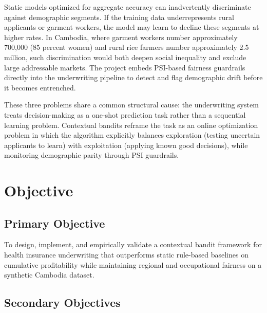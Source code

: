 Static models optimized for aggregate accuracy can inadvertently discriminate against demographic segments. If the training data underrepresents rural applicants or garment workers, the model may learn to decline these segments at higher rates. In Cambodia, where garment workers number approximately 700,000 (85 percent women) and rural rice farmers number approximately 2.5 million, such discrimination would both deepen social inequality and exclude large addressable markets. The project embeds PSI-based fairness guardrails directly into the underwriting pipeline to detect and flag demographic drift before it becomes entrenched.

These three problems share a common structural cause: the underwriting system treats decision-making as a one-shot prediction task rather than a sequential learning problem. Contextual bandits reframe the task as an online optimization problem in which the algorithm explicitly balances exploration (testing uncertain applicants to learn) with exploitation (applying known good decisions), while monitoring demographic parity through PSI guardrails.

\section{Objective}\label{objective}

\subsection{Primary Objective}\label{primary-objective}

To design, implement, and empirically validate a contextual bandit framework for health insurance underwriting that outperforms static rule-based baselines on cumulative profitability while maintaining regional and occupational fairness on a synthetic Cambodia dataset.

\subsection{Secondary Objectives}\label{secondary-objectives}

